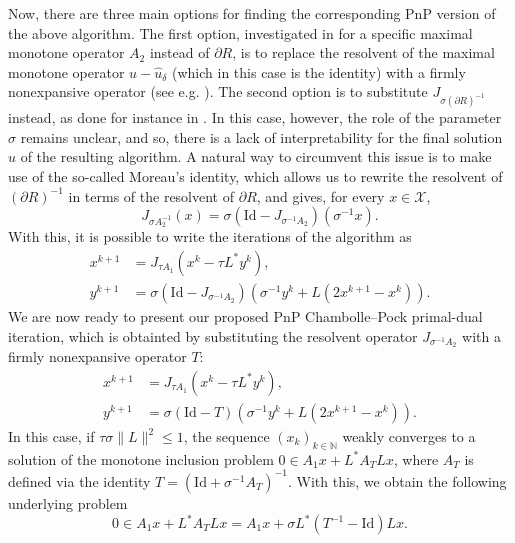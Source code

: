 \documentclass[onefignum,onetabnum]{siamonline250211}
\newcommand{\cX}{\mathcal{X}}
\begin{document}
Now, there are three main options for finding the corresponding PnP version of the above algorithm. The first option, investigated in \cite{Santos2024} for a specific maximal monotone operator $A_2$ instead of $\partial R$, is to replace the resolvent of the maximal monotone operator $u-\hat{u}_\delta$ (which in this case is the identity) with a firmly nonexpansive operator (see e.g. \cite{Suzuki2024}). The second option is to substitute $J_{\sigma (\partial R)^{-1}}$ instead, as done for instance in \cite{Santos2024}. In this case, however, the role of the parameter $\sigma$ remains unclear, and so, there is a lack of interpretability for the final solution $u$ of the resulting algorithm. A natural way to circumvent this issue is to make use of the so-called Moreau's identity, which allows us to rewrite the resolvent of $(\partial R)^{-1}$ in terms of the resolvent of $\partial R$, and gives, for every $x\in\cX$,
$$
J_{\sigma A_2^{-1}}(x)=\sigma (\mathrm{Id}-J_{\sigma^{-1}A_2})( \sigma^{-1}x).
$$
With this, it is possible to write the iterations of the algorithm as
\begin{equation}\label{eq:Moreau_CP}
    \begin{aligned}
    x^{k+1} & = J_{\tau A_1}( x^k-\tau L^* y^{k}),\\
    y^{k+1} & = \sigma (\mathrm{Id}- J_{\sigma^{-1} A_2})\left(\sigma^{-1}y^k + L(2x^{k+1}-x^k)\right).
    \end{aligned}
\end{equation}
We are now ready to present our proposed PnP Chambolle--Pock primal-dual iteration, which is obtainted by substituting the resolvent operator $J_{\sigma^{-1} A_2}$ with a firmly nonexpansive operator $T$:
\begin{equation}\label{eq:pnpcp}
\tag{PnP-CP}
    \begin{aligned}
    x^{k+1} & = J_{\tau A_1}( x^k-\tau L^* y^{k}),\\
    y^{k+1} & = \sigma (\mathrm{Id}- T)\left(\sigma^{-1}y^k + L(2x^{k+1}-x^k)\right).
    \end{aligned}
\end{equation}
In this case, if $\tau \sigma \|L\|^2\leq 1$, the sequence $(x_k)_{k\in\mathbb{N}}$ weakly converges to a solution of the monotone inclusion problem $0\in A_1 x + L^* A_T L x$, where $A_T$ is defined via the identity $T=(\mathrm{Id}+\sigma^{-1}A_T)^{-1}$. With this, we obtain the following underlying problem
\begin{equation}\label{eq:underlying_problem_CP} 0\in A_1 x +  L^* A_T L x= A_1 x + \sigma L^* (T^{-1}-\mathrm{Id}) L x.\end{equation}
\end{document}
